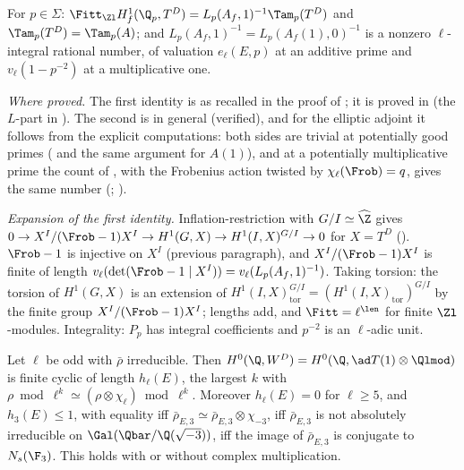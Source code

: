 \begin{sloppypar}
\begin{lemma}\label{lem:paper:fpr}
For $p\in\Sigma$: $\Fitt_{\Zl}H^1_f(\Q_p,T^D)=L_p(A_f,1)^{-1}\Tam_p(T^D)$ and $\Tam_p(T^D)=\Tam_p(A)$; and $L_p(A_f,1)^{-1}=L_p(A_f(1),0)^{-1}$ is a nonzero $\ell$-integral rational number, of
valuation $e_\ell(E,p)$ at an additive prime and $v_\ell(1-p^{-2})$ at a multiplicative one.
\end{lemma}

\noindent\emph{Where proved.} The first identity is \cite[I.4.2.2]{FPR94} as recalled in the proof of \cite[Theorem 2.15]{DFG04}; it is proved in  (the
$L$-part in ). The second is \cite[(57)]{DFG04} in general (verified), and for the elliptic adjoint it follows from the explicit computations: both sides are
trivial at potentially good primes ( and the same argument for $A(1)$), and at a potentially multiplicative prime the count of , with
the Frobenius action twisted by $\chi_\ell(\Frob)=q$, gives the same number (; ).

\emph{Expansion of the first identity.} Inflation-restriction with $G/I\simeq\widehat\Z$ gives $0\to X^I/(\Frob-1)X^I\to H^1(G,X)\to H^1(I,X)^{G/I}\to0$ for $X=T^D$ (). $\Frob-1$ is
injective on $X^I$ (previous paragraph), and $X^I/(\Frob-1)X^I$ is finite of length $v_\ell(\det(\Frob-1\mid X^I))=v_\ell(L_p(A_f,1)^{-1})$. Taking torsion: the torsion of $H^1(G,X)$ is an
extension of $H^1(I,X)^{G/I}_{\mathrm{tor}}=(H^1(I,X)_{\mathrm{tor}})^{G/I}$ by the finite group $X^I/(\Frob-1)X^I$; lengths add, and $\Fitt=\ell^{\len}$ for finite $\Zl$-modules. Integrality: $P_p$ has
integral coefficients and $p^{-2}$ is an $\ell$-adic unit.

\begin{lemma}\label{lem:paper:h0}
Let $\ell$ be odd with $\bar\rho$ irreducible. Then $H^0(\Q,W^D)=H^0(\Q,\ad T(1)\otimes\Qlmod)$ is finite cyclic of length $h_\ell(E)$, the largest $k$ with $\rho\bmod\ell^k\simeq(\rho\otimes\chi_\ell)\bmod\ell^k$.
Moreover $h_\ell(E)=0$ for $\ell\ge5$, and $h_3(E)\le1$, with equality iff $\bar\rho_{E,3}\simeq\bar\rho_{E,3}\otimes\chi_{-3}$, iff $\bar\rho_{E,3}$ is not absolutely irreducible on $\Gal(\Qbar/\Q(\sqrt{-3}))$, iff the image
of $\bar\rho_{E,3}$ is conjugate to $N_s(\F_3)$. This holds with or without complex multiplication.
\end{lemma}


\end{sloppypar}
